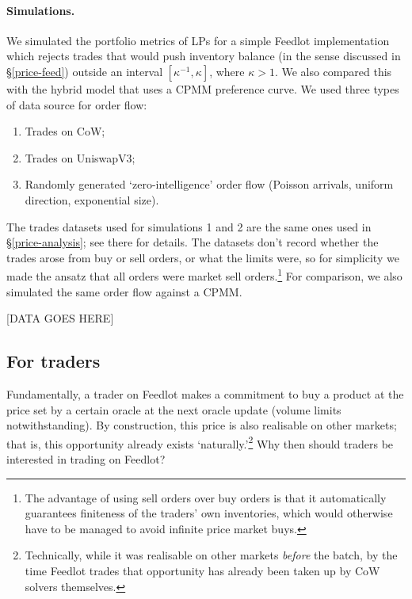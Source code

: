 \documentclass[a4paper,10pt]{article}
\theoremstyle{remark}
\begin{document}
\paragraph{Simulations.}

We simulated the portfolio metrics of LPs for a simple Feedlot implementation which rejects trades that would push inventory balance (in the sense discussed in \S\ref{price-feed}) outside an interval $[\kappa^{-1},\kappa]$, where $\kappa>1$.
%
We also compared this with the hybrid model that uses a CPMM preference curve.
%
We used three types of data source for order flow:
\begin{enumerate}
  \item Trades on CoW;
  \item Trades on UniswapV3;
  \item Randomly generated `zero-intelligence' order flow (Poisson arrivals, uniform direction, exponential size).
\end{enumerate}
The trades datasets used for simulations 1 and 2 are the same ones used in \S\ref{price-analysis}; see there for details.
%
The datasets don't record whether the trades arose from buy or sell orders, or what the limits were, so for simplicity we made the ansatz that all orders were market sell orders.\footnote{The advantage of using sell orders over buy orders is that it automatically guarantees finiteness of the traders' own inventories, which would otherwise have to be managed to avoid infinite price market buys.}
%
For comparison, we also simulated the same order flow against a CPMM.

[DATA GOES HERE]

\subsection{For traders}

Fundamentally, a trader on Feedlot makes a commitment to buy a product at the price set by a certain oracle at the next oracle update (volume limits notwithstanding).
%
By construction, this price is also realisable on other markets; that is, this opportunity already exists `naturally.'\footnote{Technically, while it was realisable on other markets \emph{before} the batch, by the time Feedlot trades that opportunity has already been taken up by CoW solvers themselves.}
%
Why then should traders be interested in trading on Feedlot?
\end{document}
